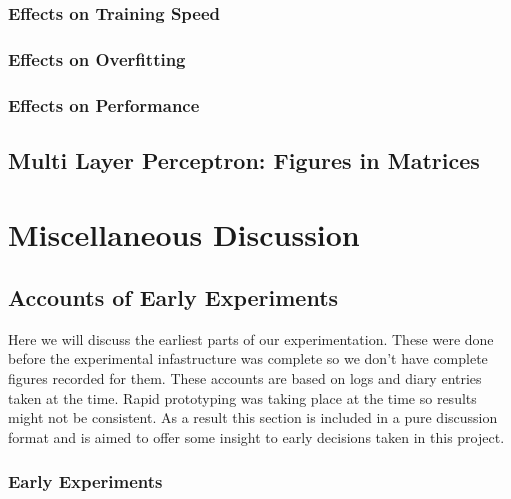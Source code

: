 \subsubsection{Effects on Training Speed}
\subsubsection{Effects on Overfitting}
\subsubsection{Effects on Performance}

\subsection{Multi Layer Perceptron: Figures in Matrices}

\section{Miscellaneous Discussion}
\subsection{Accounts of Early Experiments}
Here we will discuss the earliest parts of our experimentation. These were done before the experimental infastructure was complete so we don't have complete figures recorded for them. These accounts are based on logs and diary entries taken at the time. Rapid prototyping was taking place at the time so results might not be consistent. As a result this section is included in a pure discussion format and is aimed to offer some insight to early decisions taken in this project.

\subsubsection{Early Experiments}
